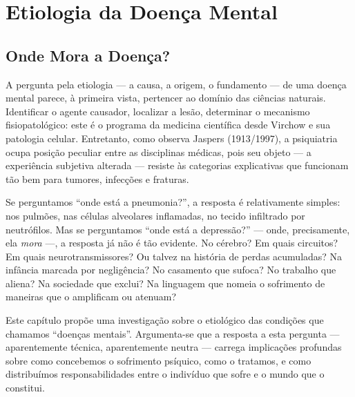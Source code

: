 \chapter{Etiologia da Doença Mental}
\label{ch:etiologia}

\section{Onde Mora a Doença?}
\label{sec:onde-mora}

A pergunta pela etiologia --- a causa, a origem, o fundamento --- de uma doença mental parece, à primeira vista, pertencer ao domínio das ciências naturais. Identificar o agente causador, localizar a lesão, determinar o mecanismo fisiopatológico: este é o programa da medicina científica desde Virchow e sua patologia celular. Entretanto, como observa Jaspers (1913/1997), a psiquiatria ocupa posição peculiar entre as disciplinas médicas, pois seu objeto --- a experiência subjetiva alterada --- resiste às categorias explicativas que funcionam tão bem para tumores, infecções e fraturas.

Se perguntamos \enquote{onde está a pneumonia?}, a resposta é relativamente simples: nos pulmões, nas células alveolares inflamadas, no tecido infiltrado por neutrófilos. Mas se perguntamos \enquote{onde está a depressão?} --- onde, precisamente, ela \textit{mora} ---, a resposta já não é tão evidente. No cérebro? Em quais circuitos? Em quais neurotransmissores? Ou talvez na história de perdas acumuladas? Na infância marcada por negligência? No casamento que sufoca? No trabalho que aliena? Na sociedade que exclui? Na linguagem que nomeia o sofrimento de maneiras que o amplificam ou atenuam?

Este capítulo propõe uma investigação sobre o  etiológico das condições que chamamos \enquote{doenças mentais}. Argumenta-se que a resposta a esta pergunta --- aparentemente técnica, aparentemente neutra --- carrega implicações profundas sobre como concebemos o sofrimento psíquico, como o tratamos, e como distribuímos responsabilidades entre o indivíduo que sofre e o mundo que o constitui.

